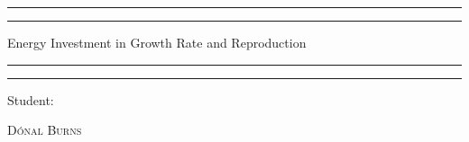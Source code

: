 
 

\begin{titlepage} %

	\centering %
	
	\scshape %
	
	\vspace*{\baselineskip} %
	
	
	\rule{\textwidth}{1.6pt}\vspace*{-\baselineskip}\vspace*{2pt} %
	\rule{\textwidth}{0.4pt} %
	
	\vspace{0.75\baselineskip} %
	
	{\LARGE Energy Investment in Growth Rate and Reproduction\\} %
	
	\vspace{0.75\baselineskip} %
	
	\rule{\textwidth}{0.4pt}\vspace*{-\baselineskip}\vspace{3.2pt} %
	\rule{\textwidth}{1.6pt} %
	
	\vspace{2\baselineskip} %
	
	
		Student:
	
	
	\vspace{0.5\baselineskip} %
	
	{\scshape\Large D\'onal Burns  \\} %
	
	\vspace{0.5\baselineskip} %
	

\end{titlepage}
